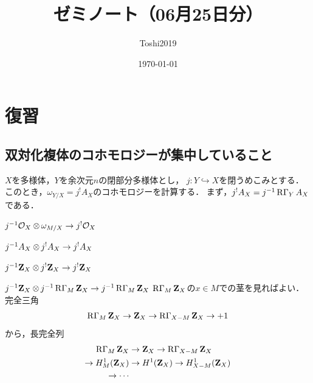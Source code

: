 \documentclass[leqno, 10pt, a4paper, dvipdfmx]{jsarticle}
\title{ゼミノート（06月25日分）}
\author{Toshi2019}
\date{\today}
\theoremstyle{definition}
\newcommand{\zz}{\mathbf{Z}}
\newcommand{\mcal}{\mathcal}
\numberwithin{equation}{section}
\newcommand{\cO}{\mcal{O}}
\newcommand{\RG}{\mathop{\mathrm{R}\hspace{-0pt}\Gamma}\nolimits}
\newcommand{\tens}[1][]{\mathbin{\otimes_{\raise1.5ex\hbox to-.1em{}{#1}}}}
\theoremstyle{mystyle}
\begin{document}
\maketitle
\tableofcontents

\section{復習}

\subsection*{双対化複体のコホモロジーが集中していること}

\(X\)を多様体，\(Y\)を余次元\(n\)の閉部分多様体とし，
\(j\colon Y\hookrightarrow X\)を閉うめこみとする．
このとき，\(\omega_{Y/X}=j^{!}A_X\)のコホモロジーを計算する．
まず，\(j^{!}A_X=j^{-1}\RG_{Y}A_X\)である．

\(j^{-1}\cO_X\tens[]\omega_{M/X}\to j^{!}\cO_X\)

\(j^{-1}A_X\tens[]j^{!}A_X\to j^{!}A_X\)

\(j^{-1}\zz_X\tens[]j^{!}\zz_X\to j^{!}\zz_X\)

\(j^{-1}\zz_X\tens[]j^{-1}\RG_{M}\zz_X\to j^{-1}\RG_{M}\zz_X\)
\(\RG_{M}\zz_X\)の\(x\in M\)での茎を見ればよい．
完全三角\[
    \RG_{M}\zz_{X}\to \zz_{X}\to \RG_{X-M}\zz_{X}\to +1
\]から，長完全列
\begin{align*}
    \RG_{M}\zz_{X}&\to \zz_{X}\to \RG_{X-M}\zz_{X}\\
    \to H^{1}_{M}(\zz_X)&\to H^{1}(\zz_{X})\to H^{1}_{X-M}(\zz_X)\\
    \to\cdots
\end{align*}
\end{document}

